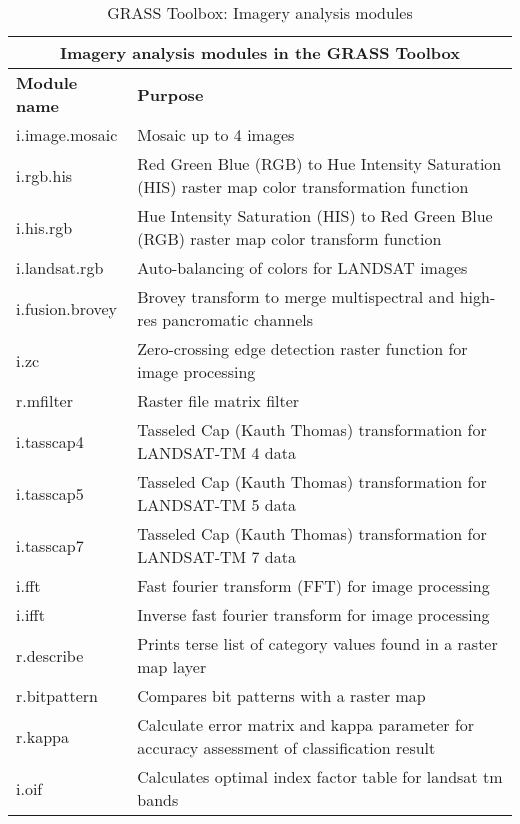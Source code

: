 \begin{table}[H]
\centering
 \begin{tabular}{|p{4cm}|p{10cm}|}
  \hline \multicolumn{2}{|c|}{\textbf{Imagery analysis modules in the GRASS
  Toolbox}} \\
  \hline \textbf{Module name} & \textbf{Purpose} \\
  \hline i.image.mosaic & Mosaic up to 4 images \\
  \hline i.rgb.his & Red Green Blue (RGB) to Hue Intensity Saturation (HIS)
  raster map color transformation function \\
  \hline i.his.rgb & Hue Intensity Saturation (HIS) to Red Green Blue (RGB)
  raster map color transform function \\
  \hline i.landsat.rgb & Auto-balancing of colors for LANDSAT images \\
  \hline i.fusion.brovey & Brovey transform to merge multispectral and
  high-res pancromatic channels \\
  \hline i.zc & Zero-crossing edge detection raster function for image
  processing \\
  \hline r.mfilter &  Raster file matrix filter\\
  \hline i.tasscap4 & Tasseled Cap (Kauth Thomas) transformation for
  LANDSAT-TM 4 data \\
  \hline i.tasscap5 & Tasseled Cap (Kauth Thomas) transformation for
  LANDSAT-TM 5 data \\
  \hline i.tasscap7 & Tasseled Cap (Kauth Thomas) transformation for
  LANDSAT-TM 7 data \\
  \hline i.fft & Fast fourier transform (FFT) for image processing \\
  \hline i.ifft & Inverse fast fourier transform for image processing \\
  \hline r.describe & Prints terse list of category values found in a raster
  map layer \\
  \hline r.bitpattern & Compares bit patterns with a raster map \\
  \hline r.kappa & Calculate error matrix and kappa parameter for accuracy
  assessment of classification result \\
  \hline i.oif & Calculates optimal index factor table for landsat tm bands \\
\hline
\end{tabular}
\caption{GRASS Toolbox: Imagery analysis modules}
\end{table}

\clearpage

